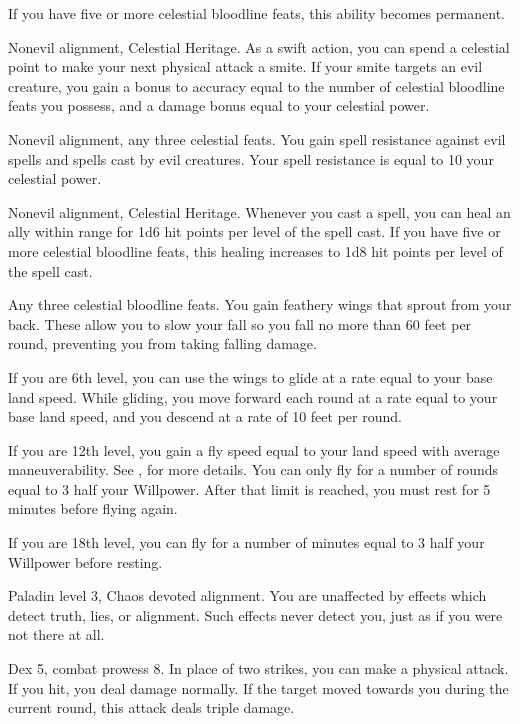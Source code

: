 If you have five or more celestial bloodline feats, this ability becomes permanent.

\featpres Nonevil alignment, Celestial Heritage.
\featben As a swift action, you can spend a celestial point to make your next physical attack a smite.
If your smite targets an evil creature, you gain a bonus to accuracy equal to the number of celestial bloodline feats you possess, and a damage bonus equal to your celestial power.

\featpres Nonevil alignment, any three celestial feats.
\featben You gain spell resistance against evil spells and spells cast by evil creatures.
Your spell resistance is equal to 10 \add your celestial power.

\featpres Nonevil alignment, Celestial Heritage.
\featben Whenever you cast a spell, you can heal an ally within \rngclose range for 1d6 hit points per level of the spell cast.
If you have five or more celestial bloodline feats, this healing increases to 1d8 hit points per level of the spell cast.

\featpre Any three celestial bloodline feats.
\featben You gain feathery wings that sprout from your back.
These allow you to slow your fall so you fall no more than 60 feet per round, preventing you from taking falling damage.

If you are 6th level, you can use the wings to glide at a rate equal to your base land speed.
While gliding, you move forward each round at a rate equal to your base land speed, and you descend at a rate of 10 feet per round.

If you are 12th level, you gain a fly speed equal to your land speed with average maneuverability.
See , for more details.
You can only fly for a number of rounds equal to 3 \add half your Willpower.
After that limit is reached, you must rest for 5 minutes before flying again.

If you are 18th level, you can fly for a number of minutes equal to 3 \add half your Willpower before resting.

\featpre Paladin level 3, Chaos devoted alignment.
\featben You are unaffected by effects which detect truth, lies, or alignment.
Such effects never detect you, just as if you were not there at all.

\featpre Dex 5, combat prowess 8.
\featben In place of two strikes, you can make a physical attack.
If you hit, you deal damage normally.
If the target moved towards you during the current round, this attack deals triple damage.

